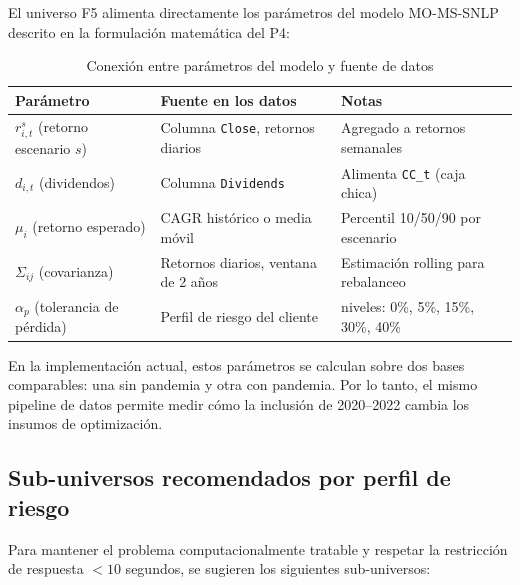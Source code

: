El universo F5 alimenta directamente los parámetros del modelo
MO-MS-SNLP descrito en la formulación matemática del P4:

\begin{table}[H]
  \centering
  \caption{Conexión entre parámetros del modelo y fuente de datos}
  \label{tab:parametros_modelo}
  \footnotesize
  \setlength{\tabcolsep}{3pt}
  \renewcommand{\arraystretch}{0.95}
  \begin{tabularx}{0.92\textwidth}{@{}l>{\raggedright\arraybackslash}X>{\raggedright\arraybackslash}X@{}}
    \toprule
    \textbf{Parámetro} & \textbf{Fuente en los datos} & \textbf{Notas} \\
    \midrule
    $r_{i,t}^s$ (retorno escenario $s$)
      & Columna \texttt{Close}, retornos diarios
      & Agregado a retornos semanales \\
    $d_{i,t}$ (dividendos)
      & Columna \texttt{Dividends}
      & Alimenta \texttt{CC\_t} (caja chica) \\
    $\mu_i$ (retorno esperado)
      & CAGR histórico o media móvil
      & Percentil 10/50/90 por escenario \\
    $\Sigma_{ij}$ (covarianza)
      & Retornos diarios, ventana de 2 años
      & Estimación rolling para rebalanceo \\
    $\alpha_p$ (tolerancia de pérdida)
      & Perfil de riesgo del cliente
      & 5 niveles: 0\%, 5\%, 15\%, 30\%, 40\% \\
    \bottomrule
  \end{tabularx}
\end{table}

En la implementación actual, estos parámetros se calculan sobre dos bases
comparables: una sin pandemia y otra con pandemia. Por lo tanto, el mismo
pipeline de datos permite medir cómo la inclusión de 2020--2022 cambia los
insumos de optimización.

\subsection*{Sub-universos recomendados por perfil de riesgo}

Para mantener el problema computacionalmente tratable y respetar
la restricción de respuesta $< 10$ segundos, se sugieren los siguientes
sub-universos:

